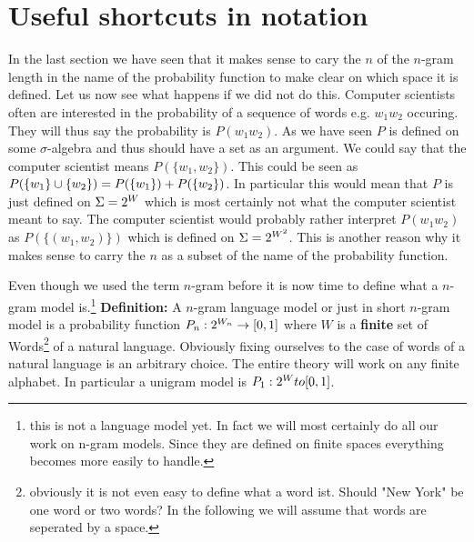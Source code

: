 \documentclass[•]{book}
\begin{document}
\section{Useful shortcuts in notation}
In the last section we have seen that it makes sense to cary the $n$ of the $n$-gram length in the name of the probability function to make clear on which space it is defined.
Let us now see what happens if we did not do this. 
Computer scientists often are interested in the probability of a sequence of words e.g. $w_1w_2 $ occuring.
They will thus say the probability is $P(w_1w_2)$. 
As we have seen $P$ is defined on some $\sigma$-algebra and thus should have a set as an argument. 
We could say that the computer scientist means $P(\{w_1,w_2\})$. 
This could be seen as $P(\{w_1\}\cup \{w_2\}) = P(\{w_1\}) + P(\{w_2\})$. 
In particular this would mean that $P$ is just defined on $\Sigma=2^{W}$ which is most certainly not what the computer scientist meant to say.
The computer scientist would probably rather interpret $P(w_1w_2)$ as $P(\{(w_1,w_2)\})$ which is defined on $\Sigma=2^{W^2}$.
This is another reason why it makes sense to carry the $n$ as a subset of the name of the probability function.

Even though we used the term $n$-gram before it is now time to define what a $n$-gram model is.\footnote{this is not a language model yet. In fact we will most certainly do all our work on n-gram models. Since they are defined on finite spaces everything becomes more easily to handle.}
\textbf{Definition:} A $n$-gram language model or just in short $n$-gram model is a probability function $P_n:2^{W_n}\to [0,1]$ where $W$ is a \textbf{finite} set of Words\footnote{obviously it is not even easy to define what a word ist. Should "New York" be one word or two words? In the following we will assume that words are seperated by a space.} of a natural language. 
Obviously fixing ourselves to the case of words of a natural language is an arbitrary choice.
The entire theory will work on any finite alphabet.
In particular a unigram model is $P_1:2^{W}to [0,1]$.
\end{document}
